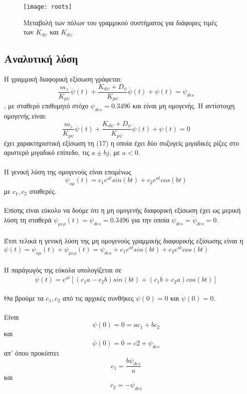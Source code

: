 \documentclass{article}
\begin{document}
\clearpage
\begin{landscape}                                                                             
\begin{figure}[hb]
 \centering
\texttt{[image: roots]}
\caption{Μεταβολή των πόλων του γραμμικού συστήματος για διάφορες τιμές των \(K_{d\psi}\) και \(K_{d\psi}\) }
\label{l_25}
\end{figure}
\end{landscape}                                                                             
 \clearpage

\subsection{Αναλυτική λύση}
Η γραμμική διαφορική εξίσωση  γράφεται: 
\[\frac{m_z}{K_{p\psi}}\ddot{\psi}(t) + \frac{K_{d\psi} + D_\psi}{K_{p\psi}}\dot{\psi}(t) + \psi(t) = \psi_{des}\], με σταθερό επιθυμητό στόχο \(\psi_{des} = 0.3496\) και είναι μη ομογενής. Η αντίστοιχη ομογενής είναι: \[\frac{m_z}{K_{p\psi}}\ddot{\psi}(t) + \frac{K_{d\psi} + D_\psi}{K_{p\psi}}\dot{\psi}(t) + \psi(t) = 0\]έχει χαρακτηριστική εξίσωση τη (17) η οποία έχει δύο συζυγείς μιγαδικές ρίζες στο αριστερό μιγαδικό επίπεδο, τις \(a \pm bj\), με \(a < 0\).\\\\Η γενική λύση της ομογενούς είναι επομένως 
\[\psi_{ομ}(t) = c_1e^{at}sin(bt) + c_2e^{at}cos(bt)\]
με \(c_1, c_2\) σταθερές.
\\\\Επίσης είναι εύκολο να δούμε ότι η μη ομογενής διαφορική εξίσωση έχει ως μερική λύση τη  σταθερά \(\psi_{μερ}(t) = \psi_{des} = 0.3496\) για την οποία \(\dot{\psi}_{des} = \ddot{\psi}_{des} = 0\).
\\\\Έτσι τελικά η γενική λύση της μη ομογενούς γραμμικής διαφορικής εξίσωσης είναι η \(\psi(t) = \psi_{ομ}(t) + \psi_{μερ}(t) = \psi_{des} + c_1e^{at}sin(bt) + c_2e^{at}cos(bt)\)
\\\\Η παράγωγός της εύκολα υπολογίζεται σε
\[\dot{\psi}(t) = e^{at}[(c_1a - c_2b)sin(bt) + (c_1b + c_2a)cos(bt)]\]
\\Θα βρούμε τα \(c_1, c_2\) από τις αρχικές συνθήκες \(\psi(0) = 0\) και \(\dot{\psi}(0) = 0\).
\\\\Είναι \[\psi(0) =  0 = ac_1 + bc_2\] και \[\dot{\psi}(0) = 0 = c2 + \psi_{des}\]απ' όπου προκύπτει \[c_1 = \frac{b\psi_{des}}{a}\] και \[c_2 = -\psi_{des}\]
\end{document}
